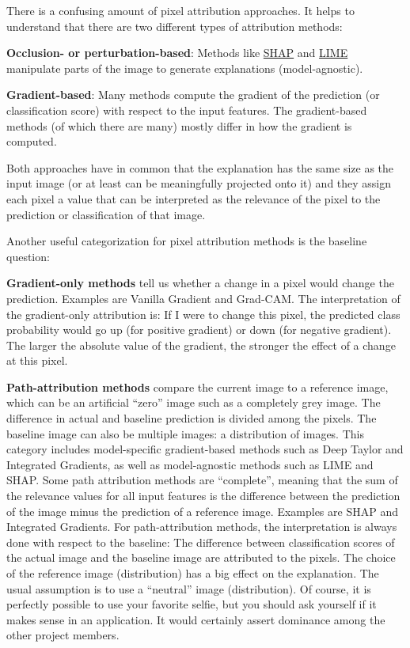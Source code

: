 \documentclass[
  12pt,
]{krantz}
\begin{document}
There is a confusing amount of pixel attribution approaches.
It helps to understand that there are two different types of attribution methods:

\textbf{Occlusion- or perturbation-based}: Methods like \protect\hyperlink{shapux5cux257D}{SHAP} and \protect\hyperlink{lime}{LIME} manipulate parts of the image to generate explanations (model-agnostic).

\textbf{Gradient-based}: Many methods compute the gradient of the prediction (or classification score) with respect to the input features. The gradient-based methods (of which there are many) mostly differ in how the gradient is computed.

Both approaches have in common that the explanation has the same size as the input image (or at least can be meaningfully projected onto it) and they assign each pixel a value that can be interpreted as the relevance of the pixel to the prediction or classification of that image.

Another useful categorization for pixel attribution methods is the baseline question:

\textbf{Gradient-only methods} tell us whether a change in a pixel would change the prediction. Examples are Vanilla Gradient and Grad-CAM.
The interpretation of the gradient-only attribution is:
If I were to change this pixel, the predicted class probability would go up (for positive gradient) or down (for negative gradient).
The larger the absolute value of the gradient, the stronger the effect of a change at this pixel.

\textbf{Path-attribution methods} compare the current image to a reference image, which can be an artificial ``zero'' image such as a completely grey image.
The difference in actual and baseline prediction is divided among the pixels.
The baseline image can also be multiple images: a distribution of images.
This category includes model-specific gradient-based methods such as Deep Taylor and Integrated Gradients, as well as model-agnostic methods such as LIME and SHAP.
Some path attribution methods are ``complete'', meaning that the sum of the relevance values for all input features is the difference between the prediction of the image minus the prediction of a reference image.
Examples are SHAP and Integrated Gradients.
For path-attribution methods, the interpretation is always done with respect to the baseline:
The difference between classification scores of the actual image and the baseline image are attributed to the pixels.
The choice of the reference image (distribution) has a big effect on the explanation.
The usual assumption is to use a ``neutral'' image (distribution).
Of course, it is perfectly possible to use your favorite selfie, but you should ask yourself if it makes sense in an application.
It would certainly assert dominance among the other project members.
\end{document}
